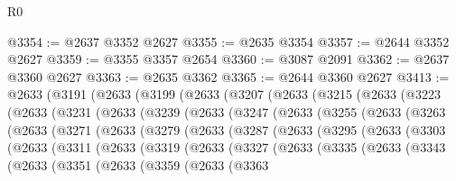 \begin{lexlean}{R0}
\begin{coremodule}
@3354 := @2637 @3352 @2627
@3355 := @2635 @3354
@3357 := @2644 @3352 @2627
@3359 := @3355 @3357 @2654
@3360 := @3087 @2091
@3362 := @2637 @3360 @2627
@3363 := @2635 @3362
@3365 := @2644 @3360 @2627
@3413 := @2633
    (@3191
      (@2633
        (@3199
          (@2633
            (@3207
              (@2633
                (@3215
                  (@2633
                    (@3223
                      (@2633
                        (@3231
                          (@2633
                            (@3239
                              (@2633
                                (@3247
                                  (@2633
                                    (@3255
                                      (@2633
                                        (@3263
                                          (@2633
                                            (@3271
                                              (@2633
                                                (@3279
                                                  (@2633
                                                    (@3287
                                                      (@2633
                                                        (@3295
                                                          (@2633
                                                            (@3303
                                                              (@2633
                                                                (@3311
                                                                  (@2633
                                                                    (@3319
                                                                      (@2633
                                                                        (@3327
                                                                          (@2633
                                                                            (@3335
                                                                              (@2633
                                                                                (@3343
                                                                                  (@2633
                                                                                    (@3351
                                                                                      (@2633
                                                                                        (@3359
                                                                                          (@2633
                                                                                            (@3363

\end{coremodule}
\end{lexlean}
